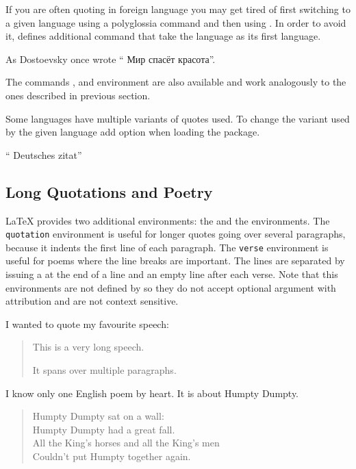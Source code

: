 If you are often quoting in foreign language you may get tired of first
switching to a given language using a polyglossia command and then using
. In order to avoid it,  defines additional
 command that take the language as its first language.
\begingroup
\setmonofont{cmuntt.otf}
\begin{example}
As Dostoevsky once wrote
\foreignquote{russian}{%
  Мир спасёт красота}.
\end{example}
\endgroup
The commands ,  and environment
 are also available and work analogously to the ones
described in previous section.

Some languages have multiple variants of quotes used. To change the variant
used by the given language add option 
when loading the  package.
\begin{example}
\usepackage[
  autostyle,
  german=guillemets,
]{csquotes}

\foreignquote{german}{%
  Deutsches zitat}
\end{example}

\subsection{Long Quotations and Poetry}
\LaTeX{} provides two additional environments: the  and the
 environments. The \texttt{quotation} environment is useful for
longer quotes going over several paragraphs, because it indents the first line
of each paragraph. The \texttt{verse} environment is useful for poems where the
line breaks are important. The lines are separated by issuing a \csi{\bs} at the
end of a line and an empty line after each verse. Note that this environments
are not defined by  so they do not accept optional argument with
attribution and are not context sensitive.

\begin{example}
I wanted to quote my
favourite speech:
\begin{quotation}
  This is a very
  long speech.

  It spans over multiple
  paragraphs.
\end{quotation}
\end{example}

\begin{example}
I know only one English
poem by heart. It is
about Humpty Dumpty.
\begin{verse}
  Humpty Dumpty sat
  on a wall:\\
  Humpty Dumpty had
  a great fall.\\
  All the King's horses
  and all the King's men\\
  Couldn't put Humpty
  together again.
\end{verse}
\end{example}

